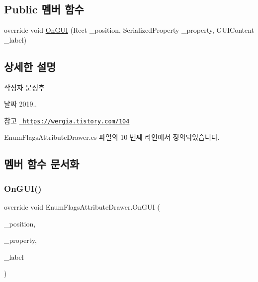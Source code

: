 \subsection*{Public 멤버 함수}
\begin{DoxyCompactItemize}
\item 
override void \mbox{\hyperlink{class_enum_flags_attribute_drawer_a4eec6e021fd9909ff723dc6fcde93e74}{On\+G\+UI}} (Rect \+\_\+position, Serialized\+Property \+\_\+property, G\+U\+I\+Content \+\_\+label)
\end{DoxyCompactItemize}


\subsection{상세한 설명}
\begin{DoxyAuthor}{작성자}
문성후 
\end{DoxyAuthor}
\begin{DoxyDate}{날짜}
2019.. 
\end{DoxyDate}
\begin{DoxySeeAlso}{참고}
\href{https://wergia.tistory.com/104}{\texttt{ https\+://wergia.\+tistory.\+com/104}} 
\end{DoxySeeAlso}


Enum\+Flags\+Attribute\+Drawer.\+cs 파일의 10 번째 라인에서 정의되었습니다.



\subsection{멤버 함수 문서화}
\mbox{\label{class_enum_flags_attribute_drawer_a4eec6e021fd9909ff723dc6fcde93e74}} 
\subsubsection{\texorpdfstring{OnGUI()}{OnGUI()}}
{\footnotesize\ttfamily override void Enum\+Flags\+Attribute\+Drawer.\+On\+G\+UI (\begin{DoxyParamCaption}\item[{Rect}]{\+\_\+position,  }\item[{Serialized\+Property}]{\+\_\+property,  }\item[{G\+U\+I\+Content}]{\+\_\+label }\end{DoxyParamCaption})}



